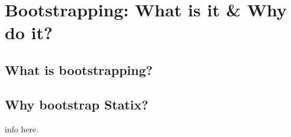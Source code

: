 
\chapter{\label{chap:bootstrapping-what-why}Bootstrapping: What is it \& Why do it?}

\section{What is bootstrapping?}

\section{Why bootstrap Statix?}

info here.